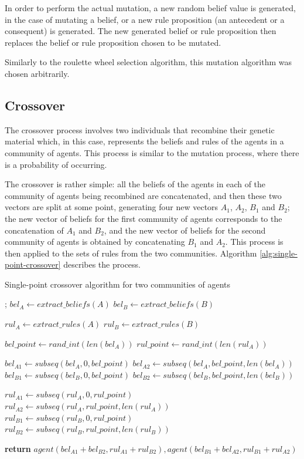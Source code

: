 In order to perform the actual mutation, a new random belief value is generated,
in the case of mutating a belief, or a new rule proposition (an antecedent or a
consequent) is generated. The new generated belief or rule proposition then
replaces the belief or rule proposition chosen to be mutated.

Similarly to the roulette wheel selection algorithm, this mutation algorithm was
chosen arbitrarily.

\subsection{Crossover}
\label{subsection:crossover}

The crossover process involves two individuals that recombine their genetic
material which, in this case, represents the beliefs and rules of the agents in
a community of agents. This process is similar to the mutation process, where
there is a probability of occurring.

The crossover is rather simple: all the beliefs of the agents in each of the
community of agents being recombined are concatenated, and then these two
vectors are split at some point, generating four new vectors $A_1$, $A_2$, $B_1$
and $B_2$; the new vector of beliefs for the first community of agents
corresponds to the concatenation of $A_1$ and $B_2$, and the new vector of
beliefs for the second community of agents is obtained by concatenating $B_1$
and $A_2$. This process is then applied to the sets of rules from the two
communities. Algorithm \ref{alg:single-point-crossover} describes the process.

\begin{algorithm}
\caption{Single-point crossover algorithm for two communities of agents}
    \label{alg:single-point-crossover}
\begin{algorithmic}[1]
    
    ;
    \State $bel_A\gets extract\_beliefs(A)$
    \State $bel_B\gets extract\_beliefs(B)$
    
    \State $rul_A\gets extract\_rules(A)$
    \State $rul_B\gets extract\_rules(B)$
    
    \State $bel\_point\gets rand\_int(len(bel_A))$
    \State $rul\_point\gets rand\_int(len(rul_A))$

    \State $bel_{A1}\gets subseq(bel_A, 0, bel\_point)$
    \State $bel_{A2}\gets subseq(bel_A, bel\_point, len(bel_A))$
    \State $bel_{B1}\gets subseq(bel_B, 0, bel\_point)$
    \State $bel_{B2}\gets subseq(bel_B, bel\_point, len(bel_B))$

    \State $rul_{A1}\gets subseq(rul_A, 0, rul\_point)$
    \State $rul_{A2}\gets subseq(rul_A, rul\_point, len(rul_A))$
    \State $rul_{B1}\gets subseq(rul_B, 0, rul\_point)$
    \State $rul_{B2}\gets subseq(rul_B, rul\_point, len(rul_B))$

    \State \textbf{return} $agent(bel_{A1} + bel_{B2}, rul_{A1} + rul_{B2}),
    agent(bel_{B1} + bel_{A2}, rul_{B1} + rul_{A2})$
    \EndProcedure
\end{algorithmic}
\end{algorithm}

